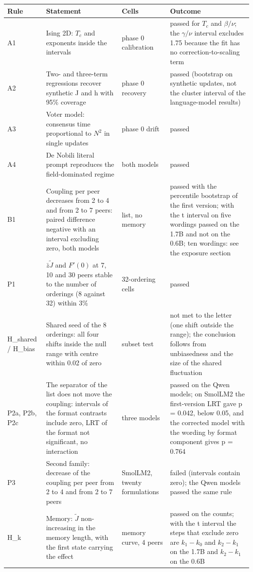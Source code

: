 \documentclass[11pt]{article}
\begin{document}
\small
\begin{longtable}{p{2.2cm}p{5cm}p{2.3cm}p{5.5cm}}
\toprule
Rule & Statement & Cells & Outcome \\
\midrule
\endhead
A1 & Ising 2D: $T_c$ and exponents inside the intervals & phase 0 calibration & passed for $T_c$ and $\beta/\nu$; the $\gamma/\nu$ interval excludes 1.75 because the fit has no correction-to-scaling term \\
A2 & Two- and three-term regressions recover synthetic J and h with 95\% coverage & phase 0 recovery & passed (bootstrap on synthetic updates, not the cluster interval of the language-model results) \\
A3 & Voter model: consensus time proportional to $N^2$ in single updates & phase 0 drift & passed \\
A4 & De Nobili literal prompt reproduces the field-dominated regime & both models & passed \\
B1 & Coupling per peer decreases from 2 to 4 and from 2 to 7 peers: paired difference negative with an interval excluding zero, both models & list, no memory & passed with the percentile bootstrap of the first version; with the t interval on five wordings passed on the 1.7B and not on the 0.6B; ten wordings: see the exposure section \\
P1 & $\bar z\tilde J$ and $F'(0)$ at 7, 10 and 30 peers stable to the number of orderings (8 against 32) within 3\% & 32-ordering cells & passed \\
H\_shared / H\_bias & Shared seed of the 8 orderings: all four shifts inside the null range with centre within 0.02 of zero & subset test & not met to the letter (one shift outside the range); the conclusion follows from unbiasedness and the size of the shared fluctuation \\
P2a, P2b, P2c & The separator of the list does not move the coupling: intervals of the format contrasts include zero, LRT of the format not significant, no interaction & three models & passed on the Qwen models; on SmolLM2 the first-version LRT gave p = 0.042, below 0.05, and the corrected model with the wording by format component gives p = 0.764 \\
P3 & Second family: decrease of the coupling per peer from 2 to 4 and from 2 to 7 peers & SmolLM2, twenty formulations & failed (intervals contain zero); the Qwen models passed the same rule \\
H\_k & Memory: $\tilde J$ non-increasing in the memory length, with the first state carrying the effect & memory curve, 4 peers & passed on the counts; with the t interval the steps that exclude zero are $k_1 - k_0$ and $k_2 - k_1$ on the 1.7B and $k_2 - k_1$ on the 0.6B \\

\end{longtable}
\end{document}
